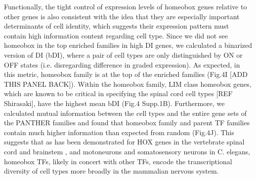 Functionally, the tight control of expression levels of homeobox genes relative to other genes is also consistent with the idea that they are especially important determinants of cell identity, which suggests their expression pattern must contain high information content regarding cell type. Since we did not see homeobox in the top enriched families in high DI genes, we calculated a binarized version of DI (bDI), where a pair of cell types are only distinguished by ON or OFF states (i.e. disregarding difference in graded expression). As expected, in this metric, homeobox family is at the top of the enriched families (Fig.4I [ADD THIS PANEL BACK]). Within the homeobox family, LIM class homeobox genes, which are known to be critical in specifying the spinal cord cell types [REF Shirasaki], have the highest mean bDI (Fig.4 Supp.1B). Furthermore, we calculated mutual information between the cell types and the entire gene sets of the PANTHER families and found that homeobox family and parent TF families contain much higher information than expected from random (Fig.4J). This suggests that as has been demonstrated for HOX genes in the vertebrate spinal cord and brainstem \cite{Dasen_2009}\cite{Philippidou_2013}, and motoneurons \cite{Kratsios_2017} and somatosensory neurons \cite{Zheng_2015} in C. elegans, homeobox TFs, likely in concert with other TFs, encode the transcriptional diversity of cell types more broadly in the mammalian nervous system.
